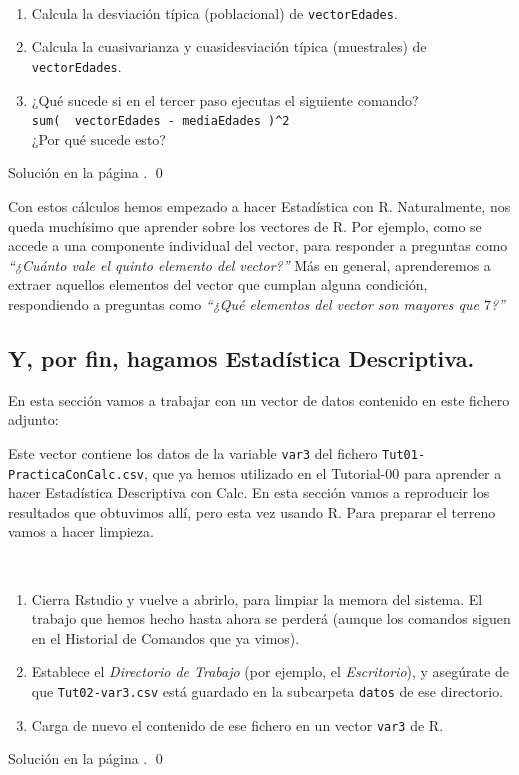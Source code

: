 \documentclass[10pt,a4paper]{article}\usepackage[]{graphicx}\usepackage[]{color}
\newcounter {cont01}
\begin{document}
\begin{ejercicio}
\label{tut02:ejercicio09}
\quad\\
\begin{enumerate}
  \item Calcula la desviación típica (poblacional) de {\tt vectorEdades}.
  \item Calcula la cuasivarianza y cuasidesviación típica (muestrales) de {\tt vectorEdades}.
  \item ¿Qué sucede si en el tercer paso ejecutas el siguiente comando?\\
    {\centering\verb#sum(  vectorEdades - mediaEdades )^2#}\\
  ¿Por qué sucede esto?
\end{enumerate}
Solución en la página \pageref{tut02:ejercicio09:sol}.  \qed
\end{ejercicio}

Con estos cálculos hemos empezado a hacer Estadística con R. Naturalmente, nos queda muchísimo que aprender sobre los vectores de R. Por ejemplo, como se accede a una componente individual del vector, para responder a preguntas como {\em ``¿Cuánto vale el quinto elemento del vector?''} Más en general, aprenderemos a extraer aquellos elementos del vector que cumplan alguna condición, respondiendo a preguntas como {\em ``¿Qué elementos del vector son mayores que $7$?''}

\subsection{Y, por fin, hagamos Estadística Descriptiva.}
\label{tut02:subsec:PorFinHagamosEstadisticaDescriptiva}

En esta sección vamos a trabajar con un vector de datos contenido en este fichero adjunto:
\begin{center}
\end{center}
Este vector contiene los datos de la variable {\tt var3} del fichero {\tt Tut01-PracticaConCalc.csv}, que ya hemos utilizado en el Tutorial-00 para aprender a hacer Estadística Descriptiva con Calc. En esta sección vamos a reproducir los resultados que obtuvimos allí, pero esta vez usando R. Para preparar el terreno vamos a hacer limpieza.
\begin{ejercicio}
\label{tut02:ejercicio10}
\quad\\
\begin{enumerate}
  \item Cierra Rstudio y vuelve a abrirlo, para limpiar la memora del sistema. El trabajo que hemos hecho hasta ahora se perderá (aunque los comandos siguen en el Historial de Comandos que ya vimos).
  \item Establece el {\em Directorio de Trabajo} (por ejemplo, el {\em Escritorio}), y asegúrate de que {\tt Tut02-var3.csv} está guardado en la subcarpeta {\tt datos} de ese directorio.
  \item Carga de nuevo el contenido de ese fichero en un vector {\tt var3} de R.
\end{enumerate}
Solución en la página \pageref{tut02:ejercicio10:sol}.  \qed
\end{ejercicio}
\end{document}

